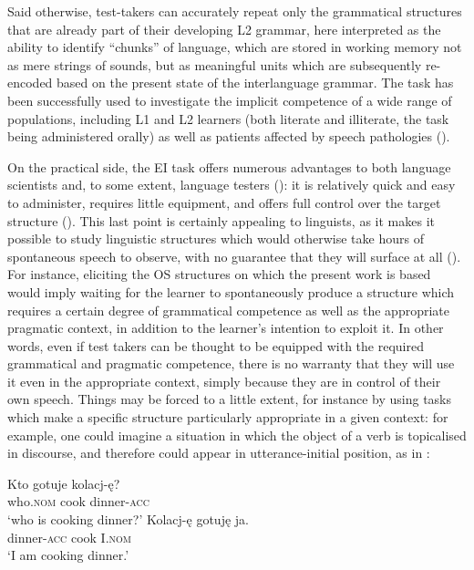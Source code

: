 Said otherwise, test-takers can accurately repeat only the grammatical structures that are already part of their developing L2 grammar, here interpreted as the ability to identify “chunks” of language, which are stored in working memory not as mere strings of sounds, but as meaningful units which are subsequently re-encoded based on the present state of the interlanguage grammar. The task has been successfully used to investigate the implicit competence of a wide range of populations, including L1 and L2 learners (both literate and illiterate, the task being administered orally) as well as patients affected by speech pathologies (\citealt{MarinisArmon-Lotem2015, Armon-LotemMeir2016}). 

On the practical side, the EI task offers numerous advantages to both language scientists and, to some extent, language testers (\citealt[187—189]{BrownAbeywickrama2010}): it is relatively quick and easy to administer, requires little equipment, and offers full control over the target structure (\citealt{Van-Moere2012}). This last point is certainly appealing to linguists, as it makes it possible to study linguistic structures which would otherwise take hours of spontaneous speech to observe, with no guarantee that they will surface at all (\citealt{FerrariNuzzo2009, BettoniDi-Biase2015}). For instance, eliciting the OS structures on which the present work is based would imply waiting for the learner to spontaneously produce a structure which requires a certain degree of grammatical competence as well as the appropriate pragmatic context, in addition to the learner's intention to exploit it. In other words, even if test takers can be thought to be equipped with the required grammatical and pragmatic competence, there is no warranty that they will use it even in the appropriate context, simply because they are in control of their own speech. Things may be forced to a little extent, for instance by using tasks which make a specific structure particularly appropriate in a given context: for example, one could imagine a situation in which the object of a verb is topicalised in discourse, and therefore could appear in utterance-initial position, as in : 

\ea%
    \label{ex:02:7}
    \ea\label{ex:02:7a}
    \gll    Kto gotuje kolacj-ę?\\
            who.\textsc{\textsc{nom}}   cook   dinner-\textsc{acc}\\
    \glt    ‘who is cooking dinner?’
    \ex\label{ex:02:7b}
    \gll    Kolacj-ę gotuję ja.\\
            dinner-\textsc{acc}   cook  I.\textsc{nom}\\
    \glt    ‘I am cooking dinner.’
    \z
\z

